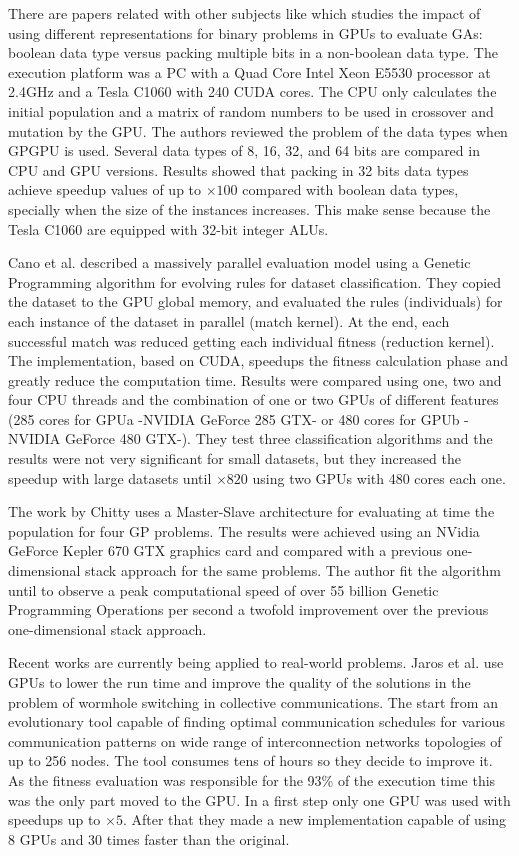 \documentclass{article}
\begin{document}
There are papers related with other subjects %
like \cite{Pedemonte:2011:BOG:2001858.2002031} which studies the impact of using different representations for binary problems in GPUs to evaluate GAs: boolean data type versus packing multiple bits in a non-boolean data type. The execution platform was a PC with a Quad Core Intel Xeon E5530 processor at 2.4GHz and a Tesla C1060 with 240 CUDA cores. The CPU only calculates the initial population and a matrix of random numbers to be used in crossover and mutation by the GPU. The authors reviewed the problem of the data types when GPGPU is used. Several data types of 8, 16, 32, and 64 bits are compared in CPU and GPU versions. Results showed that packing in 32 bits data types achieve speedup values of up to $\times100$ compared with boolean data types, specially when the size
of the instances increases. This make sense because the Tesla C1060
are equipped with 32-bit integer ALUs.  

Cano et al. \cite{SpeedingTheEvaluationofGPCano:2012} described a massively parallel evaluation model using a Genetic Programming algorithm for evolving rules for dataset classification. They copied the dataset to the GPU global memory, and evaluated the rules (individuals) for each instance of the dataset in parallel (match kernel). At the end, each successful match was reduced getting each individual fitness (reduction kernel). The implementation, based on CUDA, speedups the fitness calculation phase and greatly reduce the computation time. Results were compared using one, two and four CPU threads and the combination of one or two GPUs of different features (285 cores for GPUa -NVIDIA GeForce 285 GTX- or 480 cores for GPUb -NVIDIA GeForce 480 GTX-). They test three classification algorithms and the results were not very significant for small datasets, but they increased the speedup with large datasets until $\times820$ using two GPUs with 480 cores each one.

The work by Chitty \cite{Chitty16FastParallel} uses a Master-Slave architecture for evaluating at time the population for four GP problems. The results were achieved using an NVidia GeForce Kepler 670 GTX graphics card and compared with a previous one-dimensional stack approach for the same problems. The author fit the algorithm until to observe a peak computational speed of over 55 billion Genetic Programming Operations per second a twofold improvement over the previous one-dimensional stack approach.


Recent works are currently being applied to real-world problems. Jaros et al. \cite{Jaros14Wormhole} use GPUs to lower the run time and improve the quality of the solutions in the problem of wormhole switching in collective communications. The start from an evolutionary tool capable of finding optimal communication schedules for various communication patterns on wide range of interconnection networks topologies of up to 256 nodes. The tool consumes tens of hours so they decide to improve it. As the fitness evaluation was responsible for the 93\% of the execution time this was the only part moved to the GPU. In a first step only one GPU was used with speedups up to $\times5$. After that they made a new implementation capable of using 8 GPUs and 30 times faster than the original.
\end{document}
